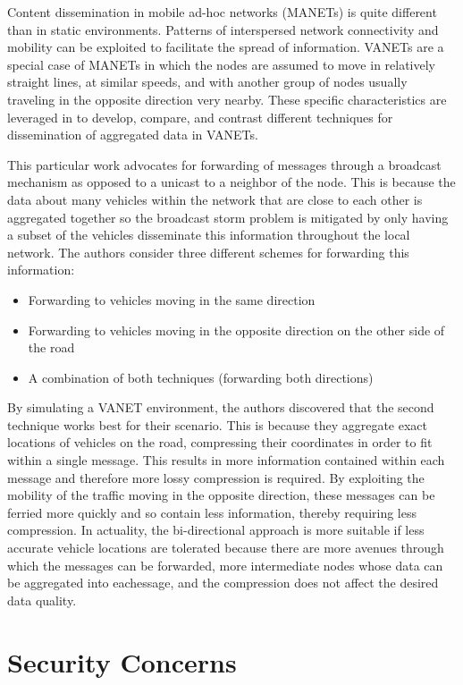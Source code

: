 \documentclass{IEEEtran}
\begin{document}
Content dissemination in mobile ad-hoc networks (MANETs) is quite different than in static environments.
Patterns of interspersed network connectivity and mobility can be exploited to facilitate the spread of information.
VANETs are a special case of MANETs in which the nodes are assumed to move in relatively straight lines, at similar speeds, and with another group of nodes usually traveling in the opposite direction very nearby.
These specific characteristics are leveraged in \cite{vanet_dissem} to develop, compare, and contrast different techniques for dissemination of aggregated data in VANETs.

This particular work advocates for forwarding of messages through a broadcast mechanism as opposed to a unicast to a neighbor of the node.  This is because the data about many vehicles within the network that are close to each other is aggregated together so the broadcast storm problem is mitigated by only having a subset of the vehicles disseminate this information throughout the local network.  The authors consider three different schemes for forwarding this information:

\begin{itemize}
\item Forwarding to vehicles moving in the same direction
\item Forwarding to vehicles moving in the opposite direction on the other side of the road
\item A combination of both techniques (forwarding both directions)
\end{itemize}

By simulating a VANET environment,  the authors discovered that the second technique works best for their scenario.  This is because they aggregate exact locations of vehicles on the road, compressing their coordinates in order to fit within a single message.  This results in more information contained within each message and therefore more lossy compression is required.
By exploiting the mobility of the traffic moving in the opposite direction, these messages can be ferried more quickly and so contain less information, thereby requiring less compression.
In actuality, the bi-directional approach is more suitable if less accurate vehicle locations are tolerated because there are more avenues through which the messages can be forwarded, more intermediate nodes whose data can be aggregated into eachessage, and the compression does not affect the desired data quality.

\section{Security Concerns}
\end{document}

